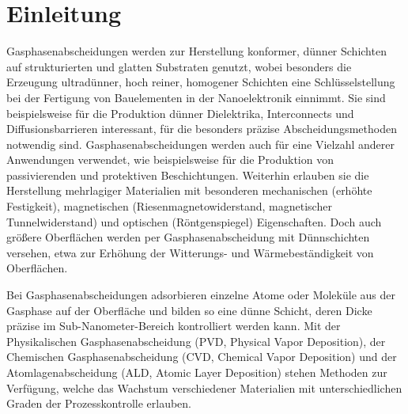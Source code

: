 \chapter{Einleitung}
\label{intro}

Gasphasenabscheidungen werden zur Herstellung konformer, dünner Schichten auf strukturierten und glatten Substraten genutzt, wobei besonders die Erzeugung ultradünner, hoch reiner, homogener Schichten eine Schlüsselstellung bei der Fertigung von Bauelementen in der Nanoelektronik einnimmt\cite{granneman_thin_1993}.
Sie sind beispielsweise für die Produktion dünner Dielektrika\cite{gordon_vapor_2001}, Interconnects\cite{waechtler_copper_2009} und Diffusionsbarrieren\cite{granneman_thin_1993,raaijmakers_low_1994} interessant, für die besonders präzise Abscheidungsmethoden notwendig sind.
Gasphasenabscheidungen werden auch für eine Vielzahl anderer Anwendungen verwendet, wie beispielsweise für die Produktion von passivierenden und protektiven Beschichtungen\cite{yun_passivation_2004,poodt_high-speed_2010,higashiwaki_algan/gan_2006}.
Weiterhin erlauben sie die Herstellung mehrlagiger Materialien mit besonderen mechanischen (erhöhte Festigkeit)\cite{cammarata_nanoindentation_1990}, magnetischen (Riesenmagnetowiderstand\cite{peter_influence_2007,seyama_giant_1999,bird_giant_1995}, magnetischer Tunnelwiderstand\cite{sun_magnetic_2006}) und optischen (Röntgenspiegel\cite{jankowski_subnanometer_1989}) Eigenschaften.
Doch auch größere Oberflächen werden per Gasphasenabscheidung mit Dünnschichten versehen, etwa zur Erhöhung der Witterungs- und Wärmebeständigkeit von Oberflächen\cite{mccurdy_successful_1999}.

Bei Gasphasenabscheidungen adsorbieren einzelne Atome oder Moleküle aus der Gasphase auf der Oberfläche und bilden so eine dünne Schicht, deren Dicke präzise im Sub-Nanometer-Bereich kontrolliert werden kann\cite{mattox_handbook_2010,pierson_handbook_1999}.
Mit der Physikalischen Gasphasenabscheidung (PVD, Physical Vapor Deposition), der Chemischen Gasphasenabscheidung (CVD, Chemical Vapor Deposition) und der Atomlagenabscheidung (ALD, Atomic Layer Deposition) stehen Methoden zur Verfügung, welche das Wachstum verschiedener Materialien mit unterschiedlichen Graden der Prozesskontrolle erlauben.

